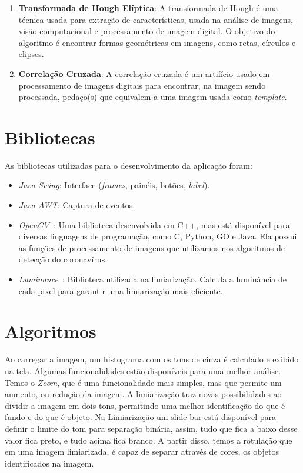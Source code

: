\documentclass[conference, brazil]{IEEEtran}
\begin{document}
\begin{enumerate}
    \item\textbf{Transformada de Hough Elíptica}: A transformada de Hough é uma técnica usada para extração de características, usada na análise de imagens, visão computacional e processamento de imagem digital. O objetivo do algoritmo é encontrar formas geométricas em imagens, como retas, círculos e elipses.
    
    \item\textbf{Correlação Cruzada}: A correlação cruzada é um artifício usado em processamento de imagens digitais para encontrar, na imagem sendo processada, pedaço(s) que equivalem a uma imagem usada como \textit{template}.
    

\end{enumerate}


\section{Bibliotecas}
\label{sec:design}
As bibliotecas utilizadas para o desenvolvimento da aplicação foram:
\begin{itemize}
\item \textit{Java Swing}: Interface (\textit{frames}, painéis, botões, \textit{label}).

\item \textit{Java AWT}: Captura de eventos.

\item \textit{OpenCV~\cite{opencv}}: Uma biblioteca desenvolvida em C++, mas está disponível para diversas linguagens de programação, como C, Python, GO e Java. Ela possui as funções de processamento de imagens que utilizamos nos algoritmos de detecção do coronavírus.

\item \textit{Luminance~\cite{Luminance}}: Biblioteca utilizada na limiarização. Calcula a luminância de cada pixel para garantir uma limiarização mais eficiente.
\end{itemize}



\section{Algoritmos}
\label{sec:Algoritmos}
Ao carregar a imagem, um histograma com os tons de cinza é calculado e exibido na tela. Algumas funcionalidades estão disponíveis para uma melhor análise. Temos o \textit{Zoom}, que é uma funcionalidade mais simples, mas que permite um aumento, ou redução da imagem. A limiarização traz novas possibilidades ao dividir a imagem em dois tons, permitindo uma melhor identificação do que é fundo e do que é objeto. Na Limiarização um slide bar está disponível para definir o limite do tom para separação binária, assim, tudo que fica a baixo desse valor fica preto, e tudo acima fica branco. A partir disso, temos a rotulação que em uma imagem limiarizada, é capaz de separar através de cores, os objetos identificados na imagem.
\end{document}
